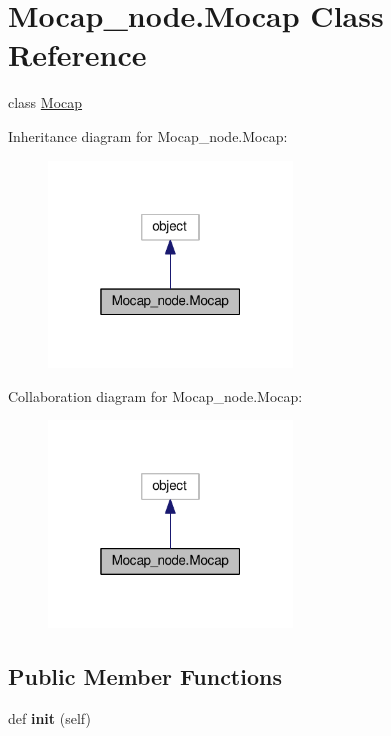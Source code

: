 \hypertarget{classMocap__node_1_1Mocap}{}\section{Mocap\+\_\+node.\+Mocap Class Reference}
\label{classMocap__node_1_1Mocap}


class \hyperlink{classMocap__node_1_1Mocap}{Mocap}  




Inheritance diagram for Mocap\+\_\+node.\+Mocap\+:
\nopagebreak
\begin{figure}[H]
\begin{center}
\leavevmode
\includegraphics[width=184pt]{classMocap__node_1_1Mocap__inherit__graph}
\end{center}
\end{figure}


Collaboration diagram for Mocap\+\_\+node.\+Mocap\+:
\nopagebreak
\begin{figure}[H]
\begin{center}
\leavevmode
\includegraphics[width=184pt]{classMocap__node_1_1Mocap__coll__graph}
\end{center}
\end{figure}
\subsection*{Public Member Functions}
\begin{DoxyCompactItemize}
\item 
def {\bfseries init} (self)\hypertarget{classMocap__node_1_1Mocap_a105ea248aaefbc083843f694a5e307de}{}\label{classMocap__node_1_1Mocap_a105ea248aaefbc083843f694a5e307de}

\end{DoxyCompactItemize}
